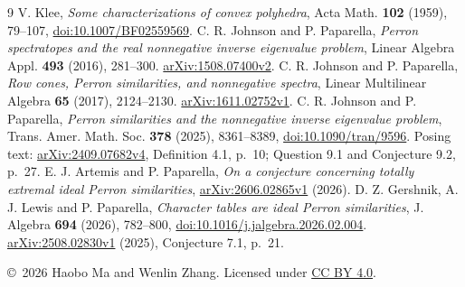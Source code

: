 \documentclass[11pt,a4paper]{article}
\begin{document}
\begin{thebibliography}{9}
 V. Klee,
\emph{Some characterizations of convex polyhedra},
Acta Math. \textbf{102} (1959), 79--107,
\href{https://doi.org/10.1007/BF02559569}{doi:10.1007/BF02559569}.
 C. R. Johnson and P. Paparella,
\emph{Perron spectratopes and the real nonnegative inverse eigenvalue problem},
Linear Algebra Appl. \textbf{493} (2016), 281--300.
\href{https://arxiv.org/abs/1508.07400v2}{arXiv:1508.07400v2}.
 C. R. Johnson and P. Paparella,
\emph{Row cones, Perron similarities, and nonnegative spectra},
Linear Multilinear Algebra \textbf{65} (2017), 2124--2130.
\href{https://arxiv.org/abs/1611.02752v1}{arXiv:1611.02752v1}.
 C. R. Johnson and P. Paparella,
\emph{Perron similarities and the nonnegative inverse eigenvalue problem},
Trans. Amer. Math. Soc. \textbf{378} (2025), 8361--8389,
\href{https://doi.org/10.1090/tran/9596}{doi:10.1090/tran/9596}.
Posing text: \href{https://arxiv.org/abs/2409.07682v4}{arXiv:2409.07682v4},
Definition 4.1, p.~10; Question 9.1 and Conjecture 9.2, p.~27.
 E. J. Artemis and P. Paparella,
\emph{On a conjecture concerning totally extremal ideal Perron similarities},
\href{https://arxiv.org/abs/2606.02865v1}{arXiv:2606.02865v1} (2026).
 D. Z. Gershnik, A. J. Lewis and P. Paparella,
\emph{Character tables are ideal Perron similarities},
J. Algebra \textbf{694} (2026), 782--800,
\href{https://doi.org/10.1016/j.jalgebra.2026.02.004}{doi:10.1016/j.jalgebra.2026.02.004}.
\href{https://arxiv.org/abs/2508.02830v1}{arXiv:2508.02830v1} (2025),
Conjecture 7.1, p.~21.
\end{thebibliography}
\noindent\small\copyright\ 2026 Haobo Ma and Wenlin Zhang.
Licensed under \href{https://creativecommons.org/licenses/by/4.0/}{CC BY 4.0}.
\end{document}
